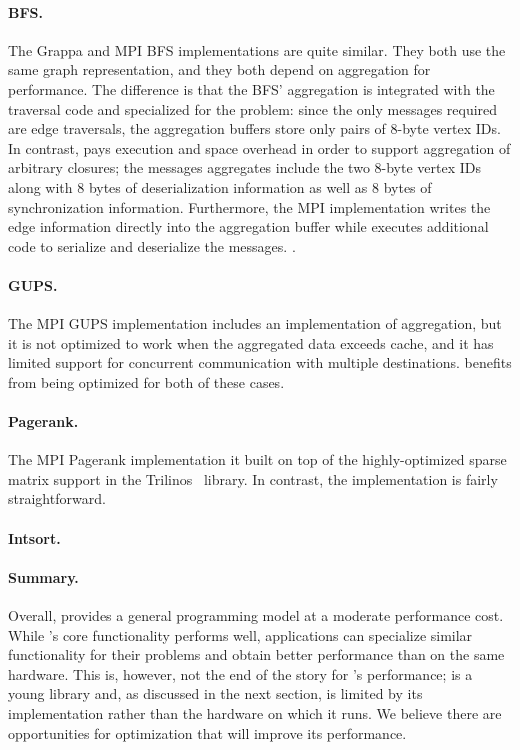 \paragraph{BFS.}
The Grappa and MPI BFS implementations are quite similar. They both
use the same graph representation, and they both depend on aggregation
for performance. The difference is that the BFS' aggregation is
integrated with the traversal code and specialized for the problem:
since the only messages required are edge traversals, the aggregation
buffers store only pairs of 8-byte vertex IDs.  In contrast, \Grappa
pays execution and space overhead in order to support aggregation of
arbitrary closures; the messages \Grappa aggregates include the two
8-byte vertex IDs along with 8 bytes of deserialization information as
well as 8 bytes of synchronization information. Furthermore, the MPI
implementation writes the edge information directly into the
aggregation buffer while \Grappa executes additional code to serialize
and deserialize the messages. .

\paragraph{GUPS.}
The MPI GUPS implementation includes an implementation of aggregation,
but it is not optimized to work when the aggregated data exceeds
cache, and it has limited support for concurrent communication with
multiple destinations. \Grappa benefits from being optimized for both
of these cases.

\paragraph{Pagerank.}
The MPI Pagerank implementation it built on top of the
highly-optimized sparse matrix support in the Trilinos~\cite{trilinos}
library. In contrast, the \Grappa implementation is fairly
straightforward. 

\paragraph{Intsort.}

\paragraph{Summary.}

Overall, \Grappa provides a general programming model at a moderate
performance cost. While \Grappa's core functionality performs well,
applications can specialize similar functionality for their problems
and obtain better performance than \Grappa on the same hardware. This
is, however, not the end of the story for \Grappa's performance;
\Grappa is a young library and, as discussed in the next section, is
limited by its implementation rather than the hardware on which it
runs. We believe there are opportunities for optimization that will
improve its performance.

